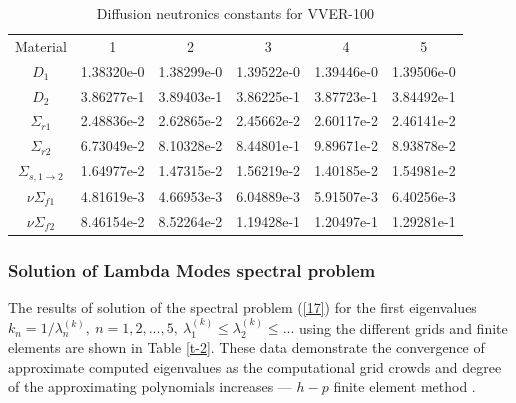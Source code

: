 \documentclass[authoryear]{elsarticle}
\begin{document}
\begin{table}[h]
\caption{Diffusion neutronics constants for VVER-100}
\label{t-1}
\begin{center}
\begin{tabular}{cccccc}
\rowcolor{col1}
Material & 1 & 2 & 3 & 4 & 5\\
\rowcolor{col3}
$D_1$ & 1.38320e-0 & 1.38299e-0  & 1.39522e-0  & 1.39446e-0  & 1.39506e-0 \\
\rowcolor{col2}
$D_2$ & 3.86277e-1 & 3.89403e-1 & 3.86225e-1 & 3.87723e-1 & 3.84492e-1 \\
\rowcolor{col3}
$\Sigma_{r1}$ & 2.48836e-2 & 2.62865e-2 & 2.45662e-2 & 2.60117e-2 & 2.46141e-2\\
\rowcolor{col2}
$\Sigma_{r2}$ & 6.73049e-2 & 8.10328e-2 & 8.44801e-1 & 9.89671e-2 & 8.93878e-2\\
\rowcolor{col3}
$\Sigma_{s,1\rightarrow 2}$ & 1.64977e-2 & 1.47315e-2 & 1.56219e-2 & 1.40185e-2 & 1.54981e-2\\
\rowcolor{col2}
$\nu\Sigma_{f1}$ & 4.81619e-3 & 4.66953e-3 & 6.04889e-3 & 5.91507e-3 & 6.40256e-3\\
\rowcolor{col3}
$\nu\Sigma_{f2}$ & 8.46154e-2 & 8.52264e-2 & 1.19428e-1 & 1.20497e-1 & 1.29281e-1\\
\end{tabular}
\end{center}
\end{table}

\subsubsection{Solution of Lambda Modes spectral problem} 
The results of solution of the spectral problem (\ref{17})  for the first eigenvalues $k_n = 1 / \lambda_n^{(k)}, \ n = 1,2, ..., 5, \ \lambda_1^{(k)} \leq \lambda_2^{(k)} \leq ...$ 
using the different grids and finite elements are shown in Table \ref{t-2}. These data demonstrate the convergence of approximate computed eigenvalues as the computational grid crowds and degree of the approximating polynomials increases --- $h-p$ finite element method \cite{vidal2014solution}.
\end{document}
